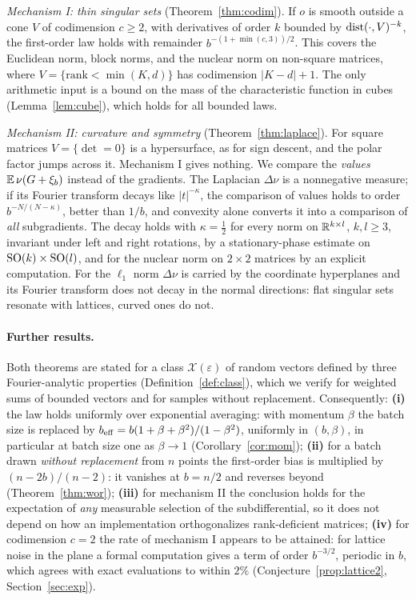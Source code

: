 \documentclass[anon,12pt]{colt2026}
\begin{document}
\emph{Mechanism I: thin singular sets} (Theorem~\ref{thm:codim}). If $o$ is smooth outside a cone $V$ of codimension
$c\ge2$, with derivatives of order $k$ bounded by $\operatorname{dist}(\cdot,V)^{-k}$, the first-order law holds with remainder
$b^{-(1+\min(c,3))/2}$. This covers the Euclidean norm, block norms, and the nuclear norm on non-square matrices, where
$V=\{\text{rank}<\min(K,d)\}$ has codimension $|K-d|+1$. The only arithmetic input is a bound on the mass of the
characteristic function in cubes (Lemma~\ref{lem:cube}), which holds for all bounded laws.

\emph{Mechanism II: curvature and symmetry} (Theorem~\ref{thm:laplace}). For square matrices $V=\{\det=0\}$ is a
hypersurface, as for sign descent, and the polar factor jumps across it. Mechanism I gives nothing. We compare the
\emph{values} $\mathbb{E}\,\nu(G+\xi_b)$ instead of the gradients. The Laplacian $\Delta\nu$ is a nonnegative measure; if its
Fourier transform decays like $|t|^{-\kappa}$, the comparison of values holds to order $b^{-N/(N-\kappa)}$, better than
$1/b$, and convexity alone converts it into a comparison of \emph{all} subgradients. The decay holds with
$\kappa=\frac12$ for every norm on $\mathbb{R}^{k\times l}$, $k,l\ge3$, invariant under left and right rotations, by a
stationary-phase estimate on $\mathrm{SO}(k)\times\mathrm{SO}(l)$, and for the nuclear norm on $2\times2$ matrices by an explicit
computation. For the $\ell_1$ norm $\Delta\nu$ is carried by the coordinate hyperplanes and its Fourier transform does not decay in the
normal directions: flat singular sets resonate with lattices, curved ones do not.

\paragraph{Further results.} Both theorems are stated for a class $\mathcal X(\varepsilon)$ of random vectors defined by
three Fourier-analytic properties (Definition~\ref{def:class}), which we verify for weighted sums of bounded vectors
and for samples without replacement. Consequently:
\textbf{(i)} the law holds uniformly over exponential averaging: with momentum $\beta$ the batch size is replaced by
$b_{\mathrm{eff}}=b(1+\beta+\beta^2)/(1-\beta^2)$, uniformly in $(b,\beta)$, in particular at batch size one as $\beta\to1$
(Corollary~\ref{cor:mom});
\textbf{(ii)} for a batch drawn \emph{without replacement} from $n$ points the first-order bias is multiplied by
$(n-2b)/(n-2)$: it vanishes at $b=n/2$ and reverses beyond (Theorem~\ref{thm:wor});
\textbf{(iii)} for mechanism II the conclusion holds for the expectation of \emph{any} measurable selection of the
subdifferential, so it does not depend on how an implementation orthogonalizes rank-deficient matrices;
\textbf{(iv)} for codimension $c=2$ the rate of mechanism I appears to be attained: for lattice noise in the plane a
formal computation gives a term of order $b^{-3/2}$, periodic in $b$, which agrees with exact evaluations to within
$2\%$ (Conjecture~\ref{prop:lattice2}, Section~\ref{sec:exp}).
\end{document}
